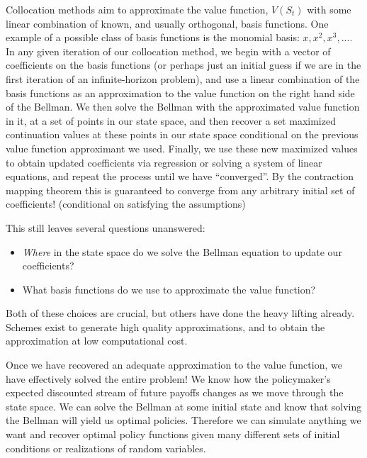 \documentclass[11pt]{article}%
\begin{document}
Collocation methods aim to approximate the value function, $V(S_t)$ with some linear combination of known, and usually orthogonal, basis functions. One example of a possible class of basis functions is the monomial basis: $x, x^2, x^3,...$. In any given iteration of our collocation method, we begin with a vector of coefficients on the basis functions (or perhaps just an initial guess if we are in the first iteration of an infinite-horizon problem), and use a linear combination of the basis functions as an approximation to the value function on the right hand side of the Bellman. We then solve the Bellman with the approximated value function in it, at a set of points in our state space, and then recover a set maximized continuation values at these points in our state space conditional on the previous value function approximant we used. Finally, we use these new maximized values to obtain updated coefficients via regression or solving a system of linear equations, and repeat the process until we have ``converged''. By the contraction mapping theorem this is guaranteed to converge from any arbitrary initial set of coefficients! (conditional on satisfying the assumptions)

This still leaves several questions unanswered:
\begin{itemize} \itemsep -2pt
	\item \emph{Where} in the state space do we solve the Bellman equation to update our coefficients?
	\item What basis functions do we use to approximate the value function?
\end{itemize}
Both of these choices are crucial, but others have done the heavy lifting already. Schemes exist to generate high quality approximations, and to obtain the approximation at low computational cost.

Once we have recovered an adequate approximation to the value function, we have effectively solved the entire problem! We know how the policymaker's expected discounted stream of future payoffs changes as we move through the state space. We can solve the Bellman at some initial state and know that solving the Bellman will yield us optimal policies. Therefore we can simulate anything we want and recover optimal policy functions given many different sets of initial conditions or realizations of random variables.
\end{document}
